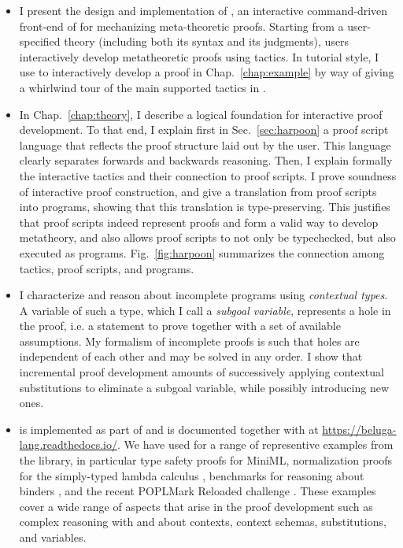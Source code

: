 \begin{itemize}
\item
  I present the design and implementation of \Harpoon, an
  interactive command-driven front-end of \Beluga{} for mechanizing
  meta-theoretic proofs.
  Starting from a user-specified theory (including both its syntax and its
  judgments), users interactively develop metatheoretic proofs using tactics.
  In tutorial style, I use \Harpoon{} to interactively develop a proof in
  Chap.~\ref{chap:example} by way of giving a whirlwind tour of the main
  supported tactics in \Harpoon.

\item
  In Chap.~\ref{chap:theory}, I describe a logical foundation for interactive
  proof development. To that end, I explain first in Sec.~\ref{sec:harpoon} a
  proof script language that reflects the proof structure laid out by the
  user. This language clearly separates forwards and backwards reasoning.
  Then, I explain formally the interactive tactics and their connection to proof
  scripts. I prove soundness of interactive proof construction, and give a
  translation from proof scripts into \Beluga{} programs, showing that this
  translation is type-preserving.
  This justifies that proof scripts indeed represent proofs and form a valid way
  to develop metatheory, and also allows proof scripts to not only be
  typechecked, but also executed as programs.
  Fig.~\ref{fig:harpoon} summarizes the connection among tactics, proof
  scripts, and \Beluga{} programs.

\item
  I characterize and reason about incomplete programs using
  \emph{contextual types}.
  A variable of such a type, which I call a \emph{subgoal variable}, represents a
  hole in the proof, i.e. a statement to prove together with a set of available
  assumptions.
  My formalism of incomplete proofs is such that holes are independent of each
  other and may be solved in any order.
  I show that incremental proof development amounts of successively applying
  contextual substitutions to eliminate a subgoal variable, while possibly
  introducing new ones.

\item
  \Harpoon{} is implemented as part of \Beluga{} and is documented together with
  \Beluga{} at \url{https://beluga-lang.readthedocs.io/}.
  We have used \Harpoon{} for a range of representive examples from the
  \Beluga{} library, in particular type safety proofs for
  MiniML, normalization proofs for the simply-typed lambda calculus
  \cite{Cave:MSCS18},
  benchmarks for reasoning about binders
  \cite{Felty:MSCS17,Felty:orbi-survey},
  and the recent POPLMark Reloaded challenge \cite{POPLMarkReloaded:19}.
  These examples cover a wide range of aspects that arise in the
  proof development such as complex reasoning with and about contexts,
  context schemas, substitutions, and variables.
\end{itemize}

